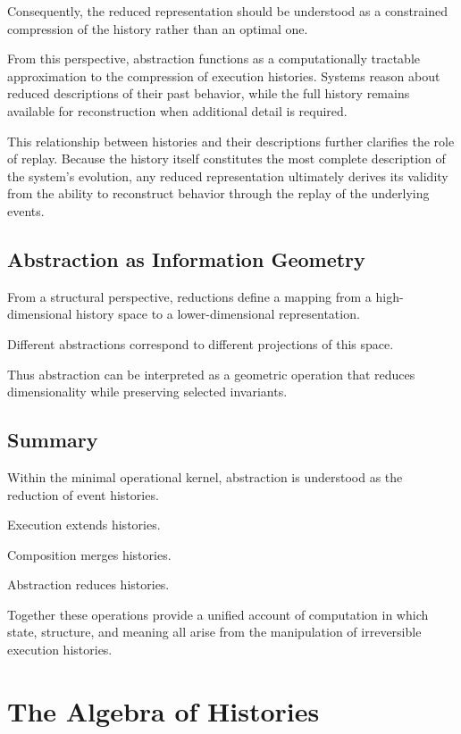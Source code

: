 \documentclass[12pt]{article}
\begin{document}
Consequently, the reduced representation should be
understood as a constrained compression of the history
rather than an optimal one.

From this perspective, abstraction functions as a
computationally tractable approximation to the
compression of execution histories. Systems reason
about reduced descriptions of their past behavior,
while the full history remains available for
reconstruction when additional detail is required.

This relationship between histories and their
descriptions further clarifies the role of replay.
Because the history itself constitutes the most
complete description of the system's evolution,
any reduced representation ultimately derives its
validity from the ability to reconstruct behavior
through the replay of the underlying events.

\subsection{Abstraction as Information Geometry}

From a structural perspective, reductions define a
mapping from a high-dimensional history space
to a lower-dimensional representation.

Different abstractions correspond to different
projections of this space.

Thus abstraction can be interpreted as a geometric
operation that reduces dimensionality while preserving
selected invariants.

\subsection{Summary}

Within the minimal operational kernel, abstraction
is understood as the reduction of event histories.

Execution extends histories.

Composition merges histories.

Abstraction reduces histories.

Together these operations provide a unified account
of computation in which state, structure, and meaning
all arise from the manipulation of irreversible
execution histories.


\section{The Algebra of Histories}
\end{document}
